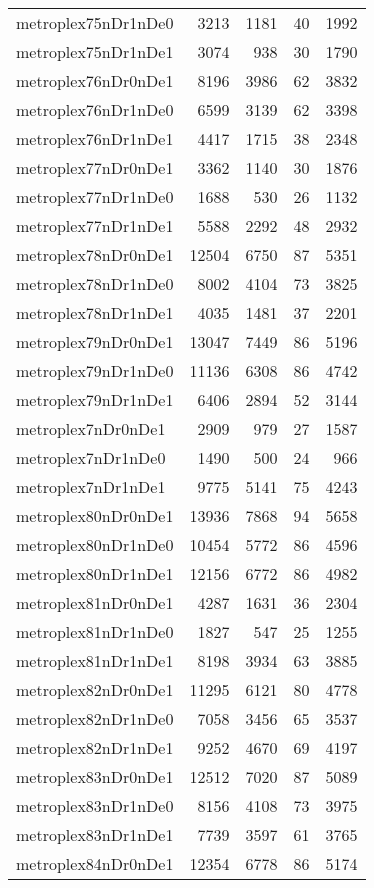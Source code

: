 \begin{longtable}{lrrrr}
metroplex75nDr1nDe0 & 3213 & 1181 & 40 & 1992 \\
metroplex75nDr1nDe1 & 3074 & 938 & 30 & 1790 \\
metroplex76nDr0nDe1 & 8196 & 3986 & 62 & 3832 \\
metroplex76nDr1nDe0 & 6599 & 3139 & 62 & 3398 \\
metroplex76nDr1nDe1 & 4417 & 1715 & 38 & 2348 \\
metroplex77nDr0nDe1 & 3362 & 1140 & 30 & 1876 \\
metroplex77nDr1nDe0 & 1688 & 530 & 26 & 1132 \\
metroplex77nDr1nDe1 & 5588 & 2292 & 48 & 2932 \\
metroplex78nDr0nDe1 & 12504 & 6750 & 87 & 5351 \\
metroplex78nDr1nDe0 & 8002 & 4104 & 73 & 3825 \\
metroplex78nDr1nDe1 & 4035 & 1481 & 37 & 2201 \\
metroplex79nDr0nDe1 & 13047 & 7449 & 86 & 5196 \\
metroplex79nDr1nDe0 & 11136 & 6308 & 86 & 4742 \\
metroplex79nDr1nDe1 & 6406 & 2894 & 52 & 3144 \\
metroplex7nDr0nDe1 & 2909 & 979 & 27 & 1587 \\
metroplex7nDr1nDe0 & 1490 & 500 & 24 & 966 \\
metroplex7nDr1nDe1 & 9775 & 5141 & 75 & 4243 \\
metroplex80nDr0nDe1 & 13936 & 7868 & 94 & 5658 \\
metroplex80nDr1nDe0 & 10454 & 5772 & 86 & 4596 \\
metroplex80nDr1nDe1 & 12156 & 6772 & 86 & 4982 \\
metroplex81nDr0nDe1 & 4287 & 1631 & 36 & 2304 \\
metroplex81nDr1nDe0 & 1827 & 547 & 25 & 1255 \\
metroplex81nDr1nDe1 & 8198 & 3934 & 63 & 3885 \\
metroplex82nDr0nDe1 & 11295 & 6121 & 80 & 4778 \\
metroplex82nDr1nDe0 & 7058 & 3456 & 65 & 3537 \\
metroplex82nDr1nDe1 & 9252 & 4670 & 69 & 4197 \\
metroplex83nDr0nDe1 & 12512 & 7020 & 87 & 5089 \\
metroplex83nDr1nDe0 & 8156 & 4108 & 73 & 3975 \\
metroplex83nDr1nDe1 & 7739 & 3597 & 61 & 3765 \\
metroplex84nDr0nDe1 & 12354 & 6778 & 86 & 5174 \\

\end{longtable}
